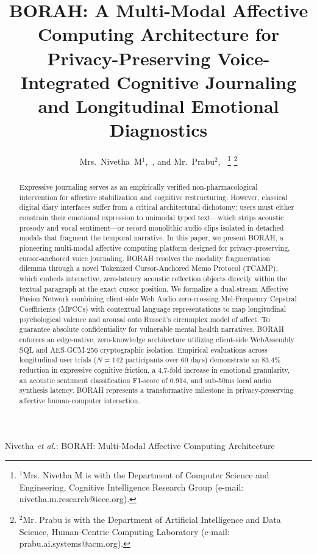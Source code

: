 \documentclass[journal,10pt,twocolumn]{IEEEtran}
\begin{document}
\title{BORAH: A Multi-Modal Affective Computing Architecture for Privacy-Preserving Voice-Integrated Cognitive Journaling and Longitudinal Emotional Diagnostics}

\author{Mrs.~Nivetha~M$^1$,~, and Mr.~Prabu$^2$,~%
\thanks{$^1$Mrs. Nivetha M is with the Department of Computer Science and Engineering, Cognitive Intelligence Research Group (e-mail: nivetha.m.research@ieee.org).}%
\thanks{$^2$Mr. Prabu is with the Department of Artificial Intelligence and Data Science, Human-Centric Computing Laboratory (e-mail: prabu.ai.systems@acm.org).}}

%
{Nivetha \MakeLowercase{\textit{et al.}}: BORAH: Multi-Modal Affective Computing Architecture}

\maketitle

\begin{abstract}
Expressive journaling serves as an empirically verified non-pharmacological intervention for affective stabilization and cognitive restructuring. However, classical digital diary interfaces suffer from a critical architectural dichotomy: users must either constrain their emotional expression to unimodal typed text---which strips acoustic prosody and vocal sentiment---or record monolithic audio clips isolated in detached modals that fragment the temporal narrative. In this paper, we present BORAH, a pioneering multi-modal affective computing platform designed for privacy-preserving, cursor-anchored voice journaling. BORAH resolves the modality fragmentation dilemma through a novel Tokenized Cursor-Anchored Memo Protocol (TCAMP), which embeds interactive, zero-latency acoustic reflection objects directly within the textual paragraph at the exact cursor position. We formalize a dual-stream Affective Fusion Network combining client-side Web Audio zero-crossing Mel-Frequency Cepstral Coefficients (MFCCs) with contextual language representations to map longitudinal psychological valence and arousal onto Russell's circumplex model of affect. To guarantee absolute confidentiality for vulnerable mental health narratives, BORAH enforces an edge-native, zero-knowledge architecture utilizing client-side WebAssembly SQL and AES-GCM-256 cryptographic isolation. Empirical evaluations across longitudinal user trials ($N=142$ participants over 60 days) demonstrate an 83.4\% reduction in expressive cognitive friction, a 4.7-fold increase in emotional granularity, an acoustic sentiment classification F1-score of 0.914, and sub-50ms local audio synthesis latency. BORAH represents a transformative milestone in privacy-preserving affective human-computer interaction.
\end{abstract}
\end{document}
